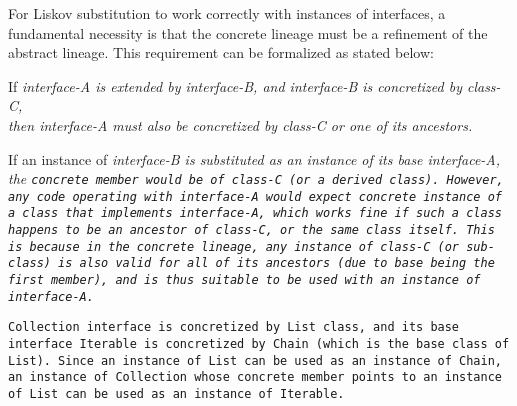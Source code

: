 For Liskov substitution to work correctly with instances of interfaces,
a fundamental necessity is that the concrete lineage
must be a refinement of the abstract lineage.
This requirement can be formalized as stated below:

\begin{center}
If \it{interface-A} is extended by \it{interface-B},
and \it{interface-B} is concretized by \it{class-C},\\
then \it{interface-A} must also be concretized by \it{class-C}
or one of its ancestors.
\end{center}

If an instance of \it{interface-B} is substituted as an
instance of its base \it{interface-A}, the \tt{concrete}
member would be of \it{class-C} (or a derived class).
However, any code operating with \it{interface-A} would expect \tt{concrete}
instance of a class that implements \it{interface-A}, which works fine if such
a class happens to be an ancestor of \it{class-C}, or the same class itself.
This is because in the concrete lineage, any instance of \it{class-C} (or sub-class)
is also valid for all of its ancestors (due to \tt{base} being the first member),
and is thus suitable to be used with an instance of \it{interface-A}.

\example \tt{Collection} interface is concretized by \tt{List} class,
and its base interface \tt{Iterable} is concretized
by \tt{Chain} (which is the base class of \tt{List}).
Since an instance of \tt{List} can be used as an instance of \tt{Chain},
an instance of \tt{Collection} whose \tt{concrete} member points to
an instance of \tt{List} can be used as an instance of \tt{Iterable}.
